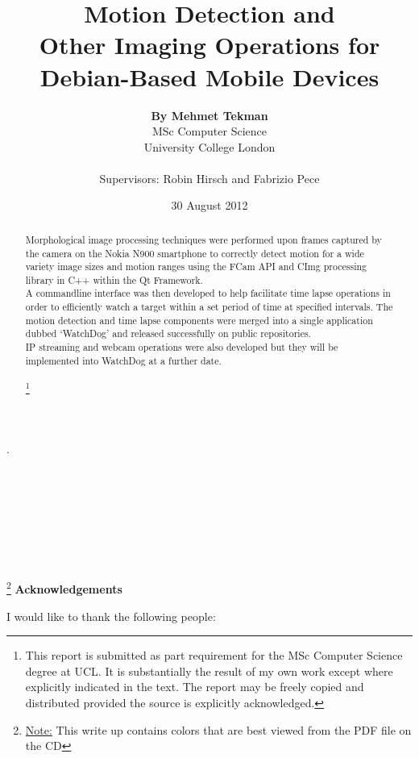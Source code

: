 \documentclass[11pt]{article} %
\title{\Huge Motion Detection and\\Other Imaging Operations for\\Debian-Based Mobile Devices }
\date{30 August 2012}
\author{{\bf By Mehmet Tekman}\\\small MSc Computer Science\\\small University College London\\\\
\large Supervisors: Robin Hirsch and Fabrizio Pece}
\newcommand{\tab}{\hspace*{2em}}
\begin{document}
\maketitle 

\part*{}{\tiny.\\\\\\\\\\\\\\\\}
\begin{abstract}
Morphological image processing techniques were performed upon frames captured by the camera on the Nokia N900 smartphone to correctly detect motion for a wide variety image sizes and motion ranges using the FCam API and CImg processing library in C++ within the Qt Framework.\\\tab A commandline interface was then developed to help facilitate time lapse operations in order to efficiently watch a target within a set period of time at specified intervals. The motion detection and time lapse components were merged into a single application dubbed ‘WatchDog’ and released successfully on public repositories.\\\tab IP streaming and webcam operations were also developed but they will be implemented into WatchDog at a further date.
\\\\\let\thefootnote\relax\footnote{This report is submitted as part requirement for the MSc Computer Science degree at UCL. It is substantially the result of my own work except where explicitly indicated in the text. The report may be freely copied and distributed provided the source is explicitly acknowledged.}
\end{abstract}
\pagebreak
\tableofcontents
\begin{center}
\vspace*{\fill}
\footnote{\underline{Note:} This write up contains colors that are best viewed from the PDF file on the CD}
{\bf Acknowledgements}\\
\end{center}
I would like to thank the following people:
\end{document}
